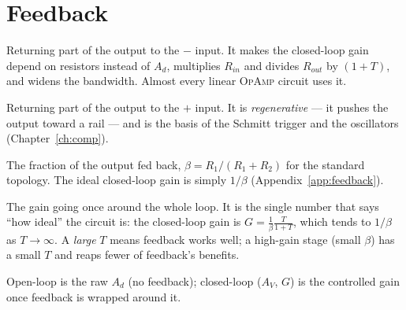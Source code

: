 \documentclass[11pt,a4paper,oneside]{book}
\newcommand{\Ad}{A_d}
\newcommand{\op}{\textsc{OpAmp}}
\begin{document}
\section{Feedback}
\begin{description}[style=unboxed,leftmargin=0pt,itemsep=5pt,parsep=0pt,
        font=\normalfont\bfseries\color{accent!85!black}]
\item[Negative feedback.] Returning part of the output to the $-$ input. It makes
  the closed-loop gain depend on resistors instead of $\Ad$, multiplies $R_{in}$ and
  divides $R_{out}$ by $(1+T)$, and widens the bandwidth. Almost every linear \op{}
  circuit uses it.
\item[Positive feedback.] Returning part of the output to the $+$ input. It is
  \emph{regenerative} --- it pushes the output toward a rail --- and is the basis of
  the Schmitt trigger and the oscillators (Chapter~\ref{ch:comp}).
\item[Feedback factor $\beta$.] The fraction of the output fed back,
  $\beta=R_1/(R_1+R_2)$ for the standard topology. The ideal closed-loop gain is
  simply $1/\beta$ (Appendix~\ref{app:feedback}).
\item[Loop gain $T=\Ad\beta$.] The gain going once around the whole loop. It is the
  single number that says ``how ideal'' the circuit is: the closed-loop gain is
  $G=\frac1\beta\frac{T}{1+T}$, which tends to $1/\beta$ as $T\!\to\!\infty$. A
  \emph{large} $T$ means feedback works well; a high-gain stage (small $\beta$) has a
  small $T$ and reaps fewer of feedback's benefits.
\item[Open-loop vs.\ closed-loop gain.] Open-loop is the raw $\Ad$ (no feedback);
  closed-loop ($A_V$, $G$) is the controlled gain once feedback is wrapped around it.
\end{description}
\end{document}
